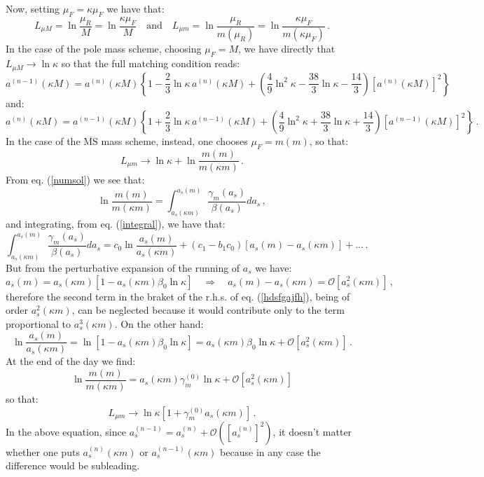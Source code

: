 \documentclass[10pt,a4paper]{article}
\begin{document}
Now, setting $\mu_F=\kappa \mu_F$ we have that:
$$
L_{\mu M} = \ln\frac{\mu_R}{M}=\ln\frac{\kappa\mu_F}{M}\quad\mbox{and}\quad L_{\mu m} = \ln\frac{\mu_R}{m(\mu_R)}=\ln\frac{\kappa\mu_F}{m(\kappa \mu_F)}\,.
$$
In the case of the pole mass scheme, choosing $\mu_F = M$, we have directly that $L_{\mu M}\rightarrow \ln\kappa$ so that the full matching condition reads:
\begin{equation}
a^{(n-1)}(\kappa M)=a^{(n)}(\kappa M)\left\{1-\frac23\ln\kappa\,a^{(n)}(\kappa M)+\left(\frac49\ln^2\kappa-\frac{38}3\ln\kappa-\frac{14}3\right)[a^{(n)}(\kappa M)]^2\right\}
\end{equation}
and:
\begin{equation}
a^{(n)}(\kappa M)=a^{(n-1)}(\kappa M)\left\{1+\frac23\ln\kappa\,a^{(n-1)}(\kappa M)+\left(\frac49\ln^2\kappa+\frac{38}3\ln\kappa+\frac{14}3\right)[a^{(n-1)}(\kappa M)]^2\right\}\,.
\end{equation}
In the case of the $\overline{\mbox{MS}}$ mass scheme, instead, one chooses $\mu_F = m(m)$, so that:
\begin{equation}
L_{\mu m} \rightarrow \ln\kappa + \ln\frac{m(m)}{m(\kappa m)}\,.
\end{equation}
From eq. (\ref{numsol}) we see that:
\begin{equation}
\ln\frac{m(m)}{m(\kappa m)}=\int_{a_s(\kappa
  m)}^{a_s(m)}\frac{\gamma_m(a_s)}{\beta(a_s)}da_s\,,
\label{chezebedei}
\end{equation}
and integrating, from eq. (\ref{integral}), we have that:
\begin{equation}
\int_{a_s(\kappa m)}^{a_s(m)}\frac{\gamma_m(a_s)}{\beta(a_s)}da_s =
c_0\ln\frac{a_s(m)}{a_s(\kappa m)} + (c_1-b_1c_0)[a_s(m)-a_s(\kappa
m)]+\dots\,.
\label{hdsfgajfh}
\end{equation}
But from the perturbative expansion of the running of $a_s$ we have:
\begin{equation}
a_s(m) = a_s(\kappa m)\left[1-a_s(\kappa m)\beta_0\ln\kappa\right]\quad\Rightarrow\quad a_s(m)-a_s(\kappa m) = \mathcal{O}[a_s^2(\kappa m)]\,,
\end{equation}
therefore the second term in the braket of the r.h.s. of eq. (\ref{hdsfgajfh}), being of order $a_s^2(\kappa m)$, can be neglected because it would contribute only to the term proportional to $a_s^3(\kappa m)$. On the other hand: 
\begin{equation}
\ln\frac{a_s(m)}{a_s(\kappa m)} = \ln\left[1-a_s(\kappa m)\beta_0\ln\kappa \right]=a_s(\kappa m)\beta_0\ln\kappa+\mathcal{O}[a_s^2(\kappa m)]\,.
\end{equation}
At the end of the day we find:
\begin{equation}
\ln\frac{m(m)}{m(\kappa m)}=a_s(\kappa m)\gamma_m^{(0)}\ln\kappa+\mathcal{O}[a_s^2(\kappa m)]
\end{equation}
so that:
\begin{equation}
L_{\mu m} \rightarrow \ln\kappa[1+\gamma_m^{(0)}a_s(\kappa m)]\,.
\label{bugni}
\end{equation}
In the above equation, since $a_s^{(n-1)}=a_s^{(n)}+\mathcal{O}([a_s^{(n)}]^2)$, it doesn't matter whether one puts $a_s^{(n)}(\kappa m)$ or $a_s^{(n-1)}(\kappa m)$ because in any case the difference would be subleading.
\end{document}
